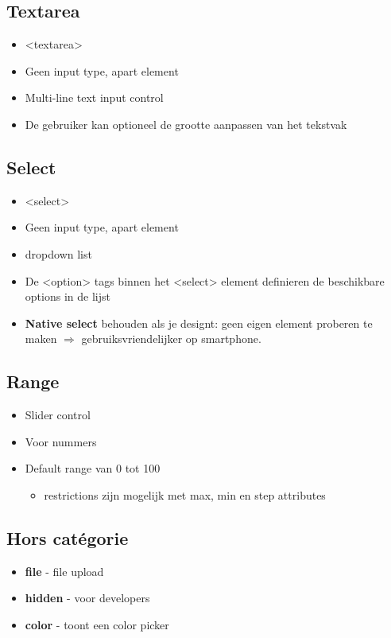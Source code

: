 \documentclass{article}
\newcommand{\bold}[1]{\textbf{#1}}
\begin{document}
\subsection{Textarea}
\begin{itemize}
    \item <textarea>
    \item Geen input type, apart element
    \item Multi-line text input control
    \item De gebruiker kan optioneel de grootte aanpassen van het tekstvak
\end{itemize}

\subsection{Select}
\begin{itemize}
    \item <select>
    \item Geen input type, apart element
    \item dropdown list
    \item De <option> tags binnen het <select> element definieren de beschikbare options in de lijst
    \item \bold{Native select} behouden als je designt: geen eigen element proberen te maken $\Rightarrow$ gebruiksvriendelijker op smartphone.
\end{itemize}

\subsection{Range}
\begin{itemize}
    \item Slider control
    \item Voor nummers
    \item Default range van 0 tot 100
    \begin{itemize}
        \item restrictions zijn mogelijk met max, min en step attributes
    \end{itemize}
\end{itemize}

\subsection{Hors catégorie}
\begin{itemize}
    \item \bold{file} - file upload
    \item \bold{hidden} - voor developers
    \item \bold{color} - toont een color picker
\end{itemize}
\end{document}
